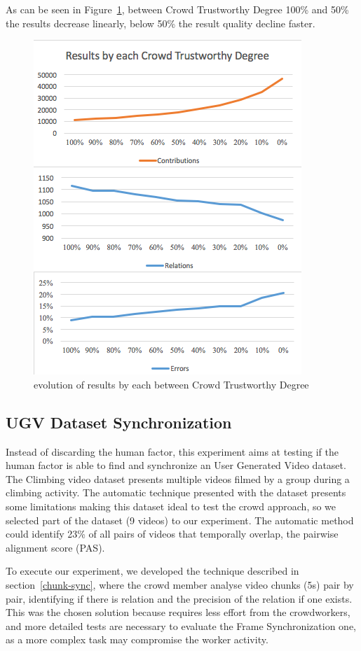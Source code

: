 \documentclass[sigconf]{acmart}
\begin{document}
As can be seen in Figure~\ref{results-line}, between Crowd Trustworthy Degree 100\% and 50\% the results decrease linearly, below 50\% the result quality decline faster.

\begin{figure}[h]
	\centerline{\includegraphics[scale=0.8] {figures/results-line}}
	\caption{evolution of results by each between Crowd Trustworthy Degree}
	\label{results-line}
\end{figure}



\subsection{UGV Dataset Synchronization} 
Instead of discarding the human factor, this experiment aims at testing if the human factor is able to find and synchronize an User Generated Video dataset. The Climbing video dataset \cite{hal-01162603} presents multiple videos filmed by a group during a climbing activity. The automatic technique presented with the dataset presents some limitations making this dataset ideal to test the crowd approach, so we selected part of the dataset (9 videos) to our experiment. The automatic method could identify 23\% of all pairs of videos that temporally overlap, the pairwise alignment score (PAS).

To execute our experiment, we developed the technique described in section~\ref{chunk-sync}, where the crowd member analyse video chunks (5s) pair by pair, identifying if there is relation and the precision of the relation if one exists. This was the chosen solution because requires less effort from the crowdworkers, and more detailed tests are necessary to evaluate the Frame Synchronization one, as a more complex task may compromise the worker activity.
\end{document}
